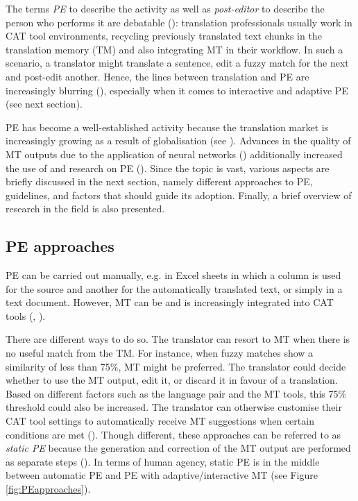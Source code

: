 The terms \textit{PE} to describe the activity as well as \textit{post-editor} to describe the person who performs it are debatable (\cite[106]{o2022deal}): translation professionals usually work in CAT tool environments, recycling previously translated text chunks in the translation memory (TM) and also integrating MT in their workflow. In such a scenario, a translator might translate a sentence, edit a fuzzy match for the next and post-edit another. Hence, the lines between translation and PE are increasingly blurring (\cite{vieira2019post}), especially when it comes to interactive and adaptive PE (see next section). 

PE has become a well-established activity because the translation market is increasingly growing as a result of globalisation (see \cite[1]{nitzke2021short}). Advances in the quality of MT outputs due to the application of neural networks (\cite{castilho2017neural}) additionally increased the use of and research on PE (\cite[177]{o2021post}). Since the topic is vast, various aspects are briefly discussed in the next section, namely different approaches to PE, guidelines, and factors that should guide its adoption. Finally, a brief overview of research in the field is also presented.

\subsection{PE approaches}
PE can be carried out manually, e.g. in Excel sheets in which a column is used for the source and another for the automatically translated text, or simply in a text document. However, MT can be and is increasingly integrated into CAT tools (\cite[45]{nitzke2021short}, \cite[111]{o2022deal}).

There are different ways to do so. The translator can resort to MT when there is no useful match from the TM. For instance, when fuzzy matches show a similarity of less than 75\%, MT might be preferred. The translator could decide whether to use the MT output, edit it, or discard it in favour of a translation. Based on different factors such as the language pair and the MT tools, this 75\% threshold could also be increased. The translator can otherwise customise their CAT tool settings to automatically receive MT suggestions when certain conditions are met (\cite[111f]{o2022deal}). Though different, these approaches can be referred to as \textit{static PE} because the generation and correction of the MT output are performed as separate steps (\cite[322]{vieira2019post}). In terms of human agency, static PE is in the middle between automatic PE and PE with adaptive/interactive MT (see Figure \ref{fig:PEapproaches}). 


